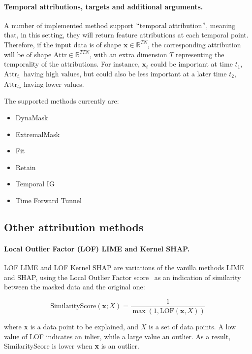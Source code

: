 \paragraph{Temporal attributions, targets and additional arguments.}

A number of implemented method support $``$temporal attribution$"$, meaning that, in this setting, they will return
feature attributions at each temporal point.
Therefore, if the input data is of shape $\textbf{x} \in \mathbb{R}^{TN}$, the corresponding attribution will be of
shape $\textrm{Attr} \in \mathbb{R}^{TTN}$, with an extra dimension $T$ representing the temporality of the attributions.
For instance, $\textbf{x}_t$ could be important at time $t_1$, $\textrm{Attr}_{t_1}$ having high values, but could also
be less important at a later time $t_2$, $\textrm{Attr}_{t_2}$ having lower values.

\newpage

The supported methods currently are:

\begin{itemize}
    \item DynaMask
    \item ExtremalMask
    \item Fit
    \item Retain
    \item Temporal IG
    \item Time Forward Tunnel
\end{itemize}


\subsection{Other attribution methods}
\label{subsec:other-attribution-methods}

\paragraph{Local Outlier Factor (LOF) LIME and Kernel SHAP\@.}

LOF LIME and LOF Kernel SHAP are variations of the vanilla methods LIME and SHAP, using the Local Outlier Factor
score~\citep{breunig2000lof} as an indication of similarity between the masked data and the original one:

\[ \textrm{SimilarityScore}(\textbf{x}; X) = \frac{1}{\max(1, \textrm{LOF}(\textbf{x}, X))} \]

where \textbf{x} is a data point to be explained, and $X$ is a set of data points.
A low value of LOF indicates an inlier, while a large value an outlier.
As a result, SimilarityScore is lower when \textbf{x} is an outlier.

